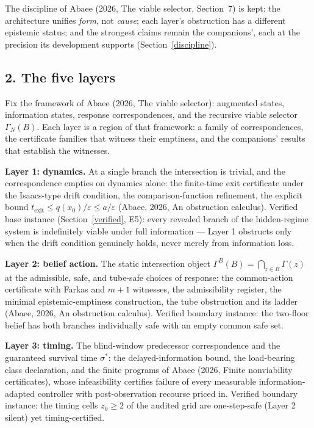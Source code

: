 \documentclass[10pt,twocolumn]{article}
\theoremstyle{definition}
\begin{document}
The discipline of Abaee (2026, The viable selector, Section~7) is kept: the architecture
unifies \emph{form}, not \emph{cause}; each layer's obstruction has a
different epistemic status; and the strongest claims remain the
companions', each at the precision its development supports
(Section~\ref{discipline}).

\subsection{2. The five layers}\label{layers}

Fix the framework of Abaee (2026, The viable selector): augmented states, information states,
response correspondences, and the recursive viable selector
\(\Gamma_{N}(B)\). Each layer is a region of that framework: a family of
correspondences, the certificate families that witness their emptiness,
and the companions' results that establish the witnesses.

\textbf{Layer 1: dynamics.} At a single branch the intersection is trivial,
and the correspondence empties on dynamics alone: the finite-time exit
certificate under the Isaacs-type drift condition, the comparison-function
refinement, the explicit bound \(t_{\mathrm{exit}} \le q(x_{0})/\varepsilon
\le a/\varepsilon\) (Abaee, 2026, An obstruction calculus). Verified base instance
(Section~\ref{verified}, E5): every revealed branch of the hidden-regime
system is indefinitely viable under full information --- Layer 1 obstructs
only when the drift condition genuinely holds, never merely from
information loss.

\textbf{Layer 2: belief action.} The static intersection object
\(\Gamma^{B}(B) = \bigcap_{z \in B} \Gamma(z)\) at the admissible, safe,
and tube-safe choices of response: the common-action certificate with
Farkas and \(m{+}1\) witnesses, the admissibility register, the
minimal epistemic-emptiness construction, the tube obstruction and its
ladder (Abaee, 2026, An obstruction calculus). Verified boundary instance: the two-floor belief has
both branches individually safe with an empty common safe set.

\textbf{Layer 3: timing.} The blind-window predecessor correspondence and
the guaranteed survival time \(\sigma^{*}\): the delayed-information bound,
the load-bearing class declaration, and the finite programs of Abaee (2026, Finite nonviability certificates),
whose infeasibility certifies failure of every measurable
information-adapted controller with post-observation recourse priced in.
Verified boundary instance: the timing cells \(z_{0} \ge 2\) of the audited
grid are one-step-safe (Layer 2 silent) yet timing-certified.
\end{document}
